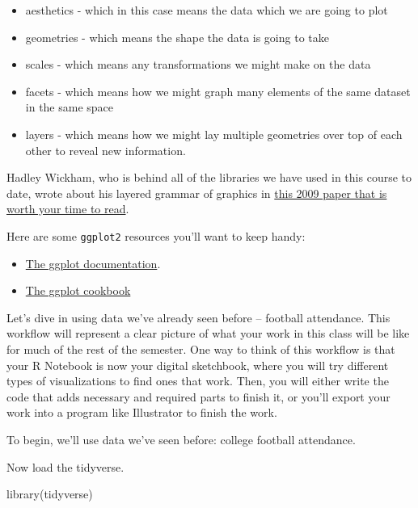 \documentclass[
]{book}
\newenvironment{Shaded}{\begin{snugshade}}{\end{snugshade}}
\newcommand{\FunctionTok}[1]{\textcolor[rgb]{0.00,0.00,0.00}{#1}}
\newcommand{\NormalTok}[1]{#1}
\providecommand{\tightlist}{%
  \setlength{\itemsep}{0pt}\setlength{\parskip}{0pt}}
\begin{document}
\begin{itemize}
\tightlist
\item
  aesthetics - which in this case means the data which we are going to plot
\item
  geometries - which means the shape the data is going to take
\item
  scales - which means any transformations we might make on the data
\item
  facets - which means how we might graph many elements of the same dataset in the same space
\item
  layers - which means how we might lay multiple geometries over top of each other to reveal new information.
\end{itemize}

Hadley Wickham, who is behind all of the libraries we have used in this course to date, wrote about his layered grammar of graphics in \href{http://byrneslab.net/classes/biol607/readings/wickham_layered-grammar.pdf}{this 2009 paper that is worth your time to read}.

Here are some \texttt{ggplot2} resources you'll want to keep handy:

\begin{itemize}
\tightlist
\item
  \href{http://ggplot2.tidyverse.org/reference/index.html}{The ggplot documentation}.
\item
  \href{http://www.cookbook-r.com/Graphs/}{The ggplot cookbook}
\end{itemize}

Let's dive in using data we've already seen before -- football attendance. This workflow will represent a clear picture of what your work in this class will be like for much of the rest of the semester. One way to think of this workflow is that your R Notebook is now your digital sketchbook, where you will try different types of visualizations to find ones that work. Then, you will either write the code that adds necessary and required parts to finish it, or you'll export your work into a program like Illustrator to finish the work.

To begin, we'll use data we've seen before: college football attendance.

Now load the tidyverse.

\begin{Shaded}
\begin{Highlighting}[]
\FunctionTok{library}\NormalTok{(tidyverse)}
\end{Highlighting}
\end{Shaded}
\end{document}
